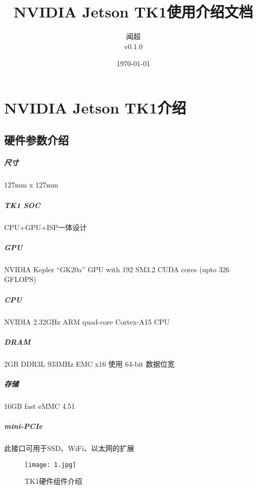 \documentclass[openany]{ctexbook}
\begin{document}
\begin{titlepage}
  \title{NVIDIA Jetson TK1使用介绍文档}
  \author{闻超\\v0.1.0}
  \date{\today}
  \maketitle
  \setcounter{page}{1}
  \tableofcontents
\end{titlepage}

\chapter{NVIDIA Jetson TK1介绍}
\section{硬件参数介绍}
\paragraph{尺寸}
127mm x 127mm
\paragraph{TK1 SOC}
CPU+GPU+ISP一体设计
\paragraph{GPU}
NVIDIA Kepler ``GK20a'' GPU with 192 SM3.2 CUDA cores (upto 326 GFLOPS)
\paragraph{CPU}
NVIDIA 2.32GHz ARM quad-core Cortex-A15 CPU
\paragraph{DRAM}
2GB DDR3L 933MHz EMC x16 使用 64-bit 数据位宽
\paragraph{存储}
16GB fast eMMC 4.51
\paragraph{mini-PCIe}
此接口可用于SSD、WiFi、以太网的扩展

\begin{figure}[h]
  \centering
  \texttt{[image: 1.jpg]}
  \caption{TK1硬件组件介绍}
\end{figure}
\end{document}

